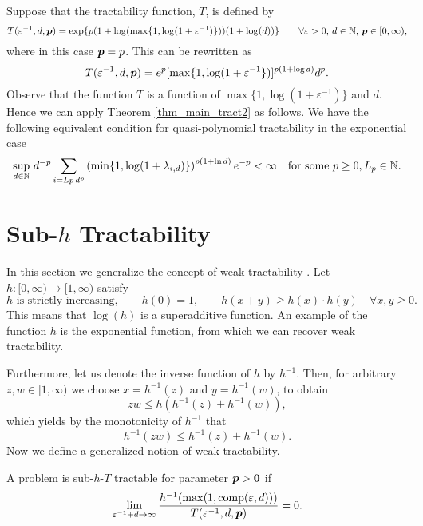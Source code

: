 \documentclass[11pt,a4paper]{article}
\begin{document}
\begin{example}

\noindent Suppose that the tractability function, $T$, is defined by
\[
 T(\varepsilon^{-1},d,\boldsymbol{p})= \exp\{p(1+\log(\max\{1,\log(1+\varepsilon^{-1})\}))(1+\log (d))\}  \qquad \forall \varepsilon > 0, \,  d \in \mathbb{N}, \, \boldsymbol{p} \in [0,\infty),
\] where in this case $\boldsymbol{p} = p$. This can be rewritten as 
\[
T(\varepsilon^{-1},d,\boldsymbol{p}) = e^p[\max\{1,\log(1+\varepsilon^{-1}\})]^{p(1+\log d)}d^p.
\]
Observe that the function $T$ is a function of $\max\{1,\log(1+\varepsilon^{-1})\}$ and $d$. Hence we can apply Theorem \ref{thm_main_tract2} as follows. We have the following equivalent condition for quasi-polynomial tractability in the exponential case
\[
\sup_{d\in\mathbb{N}}\,d^{-p}\sum_{i=Lp\,d^{p}} \left(\min\{1,\log(1+\lambda_{i,d})\} \right)^{p(1+\ln d)}e^{-p} < \infty \quad \text{for some } p \geq 0, L_p \in \mathbb{N}.
\]
\end{example}






\section{Sub-$h$ Tractability}\label{sec:subh}
In this section we generalize the concept of weak tractability \cite{}.  Let  $h:[0,\infty) \to [1,\infty)$ satisfy
\begin{equation} \label{eq:h_cond}
	h \text{ is strictly increasing}, \qquad
	h(0)=1, \qquad
 h(x+y) \ge  h(x)\cdot h(y)  \quad \forall x,y \ge 0.
\end{equation}
This means that $\log(h)$ is a superadditive function.  An example of the function $h$ is the exponential function, from which we can recover weak tractability.

Furthermore, let us denote the inverse function of $h$ by $h^{-1}$.
Then, for arbitrary $z,w \in [1,\infty)$ we choose $x=h^{-1}(z)$ and $y=h^{-1}(w)$, to obtain
\[
z w \le h (h^{-1}(z)+h^{-1}(w)),
\]
which yields by the monotonicity of $h^{-1}$ that
\begin{equation}\label{eq:submult_h_inverse}
h^{-1}(z w) \le h^{-1}(z)+h^{-1}(w).
\end{equation}
Now we define a generalized notion of weak tractability.
\begin{definition} \label{def:subhT}
	A problem is sub-$h$-$T$ tractable for parameter $\boldsymbol{p} > \boldsymbol{0}$ if
	\begin{equation*}
		\lim_{\varepsilon^{-1} + d \to \infty} \frac{h^{-1}(\max(1,\operatorname{comp}(\varepsilon,d)))}{T(\varepsilon^{-1},d,\boldsymbol{p})} = 0.
	\end{equation*}
\end{definition}
\end{document}
